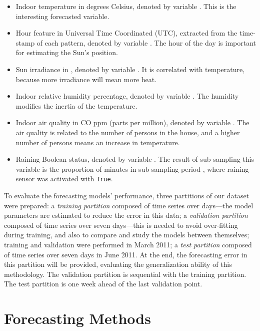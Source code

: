 \documentclass[energies,article,accept,moreauthors,pdftex,12pt,a4paper]{mdpi}
\begin{document}
\begin{itemize}
\item Indoor temperature in degrees Celsius, denoted by variable . This
 is the interesting \linebreak forecasted variable.
\vspace {-9pt}
\item Hour feature in Universal Time Coordinated (UTC), extracted from the
 time-stamp of each pattern, denoted by variable . The hour of the day is
 important for estimating the Sun's position.
\vspace {-9pt}
\item Sun irradiance in , denoted by variable
 . It is correlated with temperature, because more irradiance will mean
 more heat.
\vspace {-9pt}
\item Indoor relative humidity percentage, denoted by variable . The humidity
 modifies the inertia of the temperature.
\vspace {-9pt}
\item Indoor air quality in CO ppm (parts per million), denoted by variable
 . The air quality is related to the number of persons in the house, and a
 higher number of persons means an increase in temperature.
\vspace {-9pt}
\item Raining Boolean status, denoted by variable . The result of
 sub-sampling this variable is the proportion of minutes in sub-sampling period
 , where raining sensor was activated with \verb+True+.
\end{itemize}

To evaluate the forecasting models' performance, three partitions of our dataset
were prepared: \linebreak a \emph{training partition} composed of  time series over 
days---the model parameters are estimated to reduce the error in this data;
a \emph{validation partition} composed of  time series over seven days---this is
needed to avoid over-fitting during training, and also to compare and study the
models between themselves; training and validation were performed in March 2011; a \emph{test partition} composed of \linebreak  time series over seven days in June 2011. At the end, the forecasting error in this partition will be provided,
evaluating the generalization ability of this methodology. The validation partition
is sequential with the training partition. The test partition is one week ahead of
the last validation point.

\section{Forecasting Methods}
\vspace {-12pt}
\end{document}
